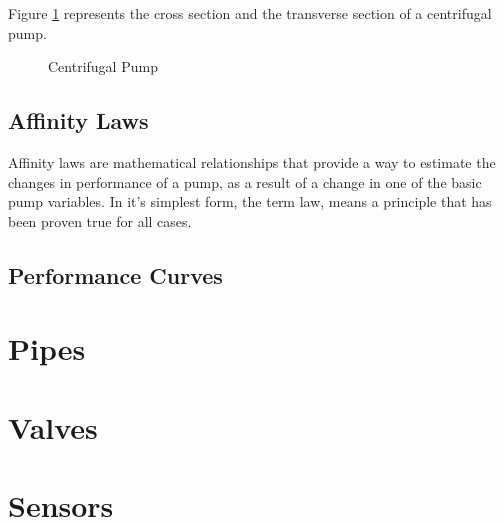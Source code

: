 Figure \ref{fig:pump_sections} represents the cross section and the transverse section of a centrifugal pump.
\newpage
\begin{figure}[h]
    \centering
    \qquad
    \hfill
    \caption{Centrifugal Pump}
    \label{fig:pump_sections}
\end{figure}

\subsection{Affinity Laws}
Affinity laws are mathematical relationships that provide a way to estimate the changes in performance of a pump, as a result
of a change in one of the basic pump variables.
In it's simplest form, the term law, means a principle that has been proven true for all cases.
\subsection{Performance Curves}

\section{Pipes}

\section{Valves}

\section{Sensors}